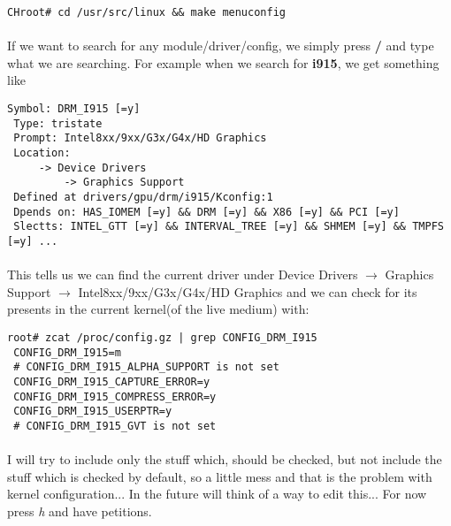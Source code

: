 \documentclass[10pt,a4paper]{article}
\begin{document}
                \begin{lstlisting}[style=BashInputCHRoot]
 CHroot# cd /usr/src/linux && make menuconfig
                \end{lstlisting}
                
                \paragraph{} If we want to search for any module/driver/config, we simply press \textbf{/} and type what we are searching. For example when we search for \textbf{i915}, we get something like
                
                \begin{lstlisting}[style=KernelConfig]
 Symbol: DRM_I915 [=y]
 Type: tristate
 Prompt: Intel8xx/9xx/G3x/G4x/HD Graphics
 Location:
     -> Device Drivers
         -> Graphics Support
 Defined at drivers/gpu/drm/i915/Kconfig:1
 Dpends on: HAS_IOMEM [=y] && DRM [=y] && X86 [=y] && PCI [=y]
 Slectts: INTEL_GTT [=y] && INTERVAL_TREE [=y] && SHMEM [=y] && TMPFS [=y] ...
                \end{lstlisting}
                
                \paragraph{} This tells us we can find the current driver under Device Drivers $ \rightarrow $ Graphics Support $ \rightarrow $ Intel8xx/9xx/G3x/G4x/HD Graphics and we can check for its presents in the current kernel(of the live medium) with:
                
                \begin{lstlisting}[style=BashInputRoot]
root# zcat /proc/config.gz | grep CONFIG_DRM_I915
 CONFIG_DRM_I915=m
 # CONFIG_DRM_I915_ALPHA_SUPPORT is not set
 CONFIG_DRM_I915_CAPTURE_ERROR=y
 CONFIG_DRM_I915_COMPRESS_ERROR=y
 CONFIG_DRM_I915_USERPTR=y
 # CONFIG_DRM_I915_GVT is not set
                \end{lstlisting}
                
                \paragraph{} I will try to include only the stuff which, should be checked, but not include the stuff which is checked by default, so a little mess and that is the problem with kernel configuration... In the future will think of a way to edit this... For now press \textit{h} and have petitions.
                
\end{document}
